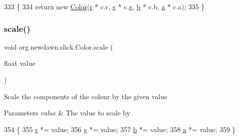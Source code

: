 \begin{DoxyCode}
333                                    \{
334         \textcolor{keywordflow}{return} \textcolor{keyword}{new} \mbox{\hyperlink{classorg_1_1newdawn_1_1slick_1_1_color_a39db992a7910141605cc2acb953c4917}{Color}}(\mbox{\hyperlink{classorg_1_1newdawn_1_1slick_1_1_color_ac07fa95108064b044dcf9a53e95dcb48}{r}} * c.r, \mbox{\hyperlink{classorg_1_1newdawn_1_1slick_1_1_color_aa6ebff7c102a1476e7b511a78397b753}{g}} * c.g, \mbox{\hyperlink{classorg_1_1newdawn_1_1slick_1_1_color_a8c0cef152e16438fee852a97e50ef7a5}{b}} * c.b, \mbox{\hyperlink{classorg_1_1newdawn_1_1slick_1_1_color_ab9288c822ff7614a77c887eb8c2595a7}{a}} * c.a);
335     \}
\end{DoxyCode}
\mbox{\label{classorg_1_1newdawn_1_1slick_1_1_color_a53597f62e247b2193191c3c2a9828fa1}} 
\subsubsection{\texorpdfstring{scale()}{scale()}}
{\footnotesize\ttfamily void org.\+newdawn.\+slick.\+Color.\+scale (\begin{DoxyParamCaption}\item[{float}]{value }\end{DoxyParamCaption})\hspace{0.3cm}{\ttfamily [inline]}}

Scale the components of the colour by the given value


\begin{DoxyParams}{Parameters}
{\em value} & The value to scale by \\
\hline
\end{DoxyParams}

\begin{DoxyCode}
354                                    \{
355         \mbox{\hyperlink{classorg_1_1newdawn_1_1slick_1_1_color_ac07fa95108064b044dcf9a53e95dcb48}{r}} *= value;
356         \mbox{\hyperlink{classorg_1_1newdawn_1_1slick_1_1_color_aa6ebff7c102a1476e7b511a78397b753}{g}} *= value;
357         \mbox{\hyperlink{classorg_1_1newdawn_1_1slick_1_1_color_a8c0cef152e16438fee852a97e50ef7a5}{b}} *= value;
358         \mbox{\hyperlink{classorg_1_1newdawn_1_1slick_1_1_color_ab9288c822ff7614a77c887eb8c2595a7}{a}} *= value;
359     \}
\end{DoxyCode}
\mbox{\label{classorg_1_1newdawn_1_1slick_1_1_color_aeb251c89cb3901649462a0c9bb03b661}} 
